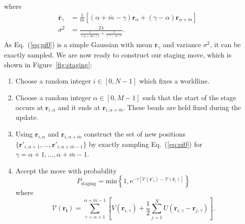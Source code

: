 \documentclass[prb,aps,amssym,nofootinbib,floatfix,notitlepage]{revtex4-1}
\renewcommand{\vec}[1]{\boldsymbol{#1}}
\newcommand{\e}[1]{\mathrm{e}^{#1}}
\renewcommand{\eqref}[1]{Eq.~(\ref{#1})}
\begin{document}
%
where 
%
\begin{align}
    \overline{\vec{r}}_\gamma &= \frac{1}{\overline{m}}
    \left[(\alpha+\overline{m}-\gamma)\vec{r}_{\alpha} +
    (\gamma-\alpha)\vec{r}_{\alpha+\overline{m}}\right] \nonumber \\
    \sigma^2 &= \frac{2\lambda}{\frac{1}{(\alpha + \overline{m}\gamma)\tau} +
\frac{1}{(\gamma-\alpha)\tau}}.
\end{align}
%
As \eqref{eq:pi0} is a simple Gaussian with mean $\overline{\vec{r}}_\gamma$ and
variance $\sigma^2$, it can be exactly sampled.  We are now ready to construct
our staging move, which is shown in Figure~\ref{fig:staging}:
\begin{enumerate}
    \item Choose a random integer $i \in [0,N-1]$ which fixes a worldline.
    \item Choose a random integer $\alpha \in [0,M-1]$ such that the start of
        the stage occurs at $\vec{r}_{i,\alpha}$ and it ends at
        $\vec{r}_{i,\alpha+\overline{m}}$.  These beads are held fixed during
    the update.  \item Using $\vec{r}_{i,\alpha}$ and
        $\vec{r}_{i,\alpha+\overline{m}}$ construct the set of new positions
        $\{\vec{r}'_{i,\alpha+1},\ldots,\vec{r}'_{i,\alpha+\overline{m}-1}\}$ by exactly
        sampling \eqref{eq:pi0} for $\gamma =
        \alpha+1,\ldots,\alpha+\overline{m}-1$.
    \item Accept the move with probability
\begin{equation}
    P_{\text{staging}} = \mathrm{min} 
    \left\{1,\e{-\tau[\mathcal{V}(\vec{r}'_i)-\mathcal{V}(\vec{r}_i)]} \right\}
\end{equation}
%
where 
%
\begin{equation}
    \mathcal{V}(\vec{r_i}) = \sum_{\gamma=\alpha+1}^{\alpha+\overline{m}-1}
    \left[ V(\vec{r}_{i,\gamma}) + \frac{1}{2}\sum_{j=1}^{N}
    U(\vec{r}_{i,\gamma}-\vec{r}_{j,\gamma})\right].
\end{equation}
%
\end{enumerate}
\end{document}
